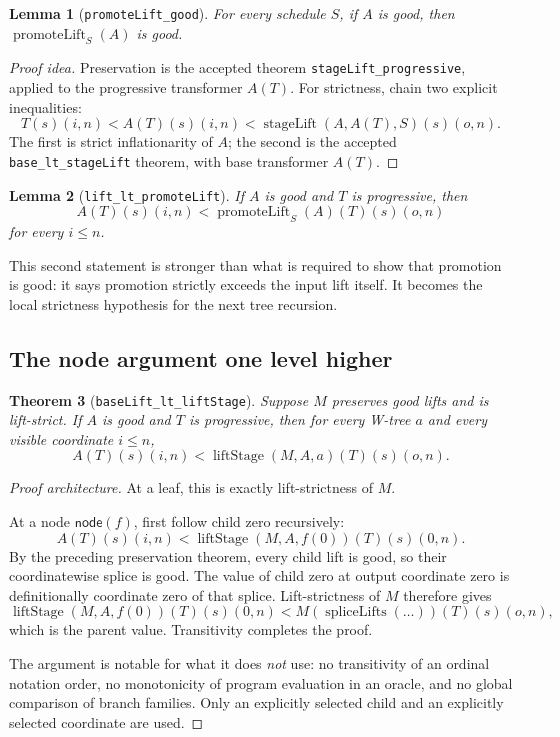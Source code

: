 \documentclass[11pt]{article}
\newtheorem{theorem}{Theorem}[section]
\newtheorem{lemma}[theorem]{Lemma}
\theoremstyle{definition}
\theoremstyle{remark}
\newcommand{\leanname}[1]{\nolinkurl{#1}}
\begin{document}
\begin{lemma}[\leanname{promoteLift_good}]
For every schedule $S$, if $A$ is good, then
$\operatorname{promoteLift}_S(A)$ is good.
\end{lemma}

\begin{proof}[Proof idea]
Preservation is the accepted theorem \leanname{stageLift_progressive}, applied
to the progressive transformer $A(T)$.  For strictness, chain two explicit
inequalities:
\[
  T(s)(i,n)
  < A(T)(s)(i,n)
  < \operatorname{stageLift}(A,A(T),S)(s)(o,n).
\]
The first is strict inflationarity of $A$; the second is the accepted
\leanname{base_lt_stageLift} theorem, with base transformer $A(T)$.
\end{proof}

\begin{lemma}[\leanname{lift_lt_promoteLift}]
If $A$ is good and $T$ is progressive, then
\[
 A(T)(s)(i,n)<\operatorname{promoteLift}_S(A)(T)(s)(o,n)
\]
for every $i\le n$.
\end{lemma}

This second statement is stronger than what is required to show that promotion
is good: it says promotion strictly exceeds the input lift itself.  It becomes
the local strictness hypothesis for the next tree recursion.

\subsection{The node argument one level higher}

\begin{theorem}[\leanname{baseLift_lt_liftStage}]
Suppose $M$ preserves good lifts and is lift-strict.  If $A$ is good and $T$ is
progressive, then for every W-tree $a$ and every visible coordinate $i\le n$,
\[
  A(T)(s)(i,n)
  <\operatorname{liftStage}(M,A,a)(T)(s)(o,n).
\]
\end{theorem}

\begin{proof}[Proof architecture]
At a leaf, this is exactly lift-strictness of $M$.

At a node $\mathsf{node}(f)$, first follow child zero recursively:
\[
  A(T)(s)(i,n)
  <\operatorname{liftStage}(M,A,f(0))(T)(s)(0,n).
\]
By the preceding preservation theorem, every child lift is good, so their
coordinatewise splice is good.  The value of child zero at output coordinate
zero is definitionally coordinate zero of that splice.  Lift-strictness of $M$
therefore gives
\[
 \operatorname{liftStage}(M,A,f(0))(T)(s)(0,n)
 < M(\operatorname{spliceLifts}(\ldots))(T)(s)(o,n),
\]
which is the parent value.  Transitivity completes the proof.

The argument is notable for what it does \emph{not} use: no transitivity of an
ordinal notation order, no monotonicity of program evaluation in an oracle,
and no global comparison of branch families.  Only an explicitly selected
child and an explicitly selected coordinate are used.
\end{proof}
\end{document}
